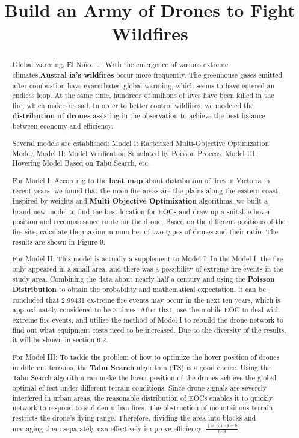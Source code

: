 \documentclass[12pt]{article}  %
\title{Build an Army of Drones to Fight Wildfires}  %
\begin{document}
\begin{abstract}
    
Global warming, El Niño...... With the emergence of various extreme climates,\textbf{Austral-ia's wildfires} occur more frequently. The greenhouse gases emitted after combustion have exacerbated global warming, which seems to have entered an endless loop. At the same time, hundreds of millions of lives have been killed in the fire, which makes us sad. In order to better control wildfires, we modeled the \textbf{distribution of drones} assisting in the observation to achieve the best balance between economy and efficiency.

Several models are established: Model I: Rasterized Multi-Objective Optimization Model; Model II: Model Verification Simulated by Poisson Process; Model III: Hovering Model Based on Tabu Search, etc.

For Model I: According to the \textbf{heat map} about distribution of fires in Victoria in recent years, we found that the main fire areas are the plains along the eastern coast. Inspired by weights and \textbf{Multi-Objective Optimization} algorithms, we built a brand-new model to find the best location for EOCs and draw up a suitable hover position and reconnaissance route for the drone. Based on the different positions of the fire site, calculate the maximum num-ber of two types of drones and their ratio. The results are shown in Figure 9.

For Model II: This model is actually a supplement to Model I. In the Model I, the fire only appeared in a small area, and there was a possibility of extreme fire events in the study area. Combining the data about nearly half a century and using the \textbf{Poisson Distribution }to obtain the probability and mathematical expectation, it can be concluded that 2.99431 ex-treme fire events may occur in the next ten years, which is approximately considered to be 3 times. After that, use the mobile EOC to deal with extreme fire events, and utilize the method of Model I to rebuild the drone network to find out what equipment costs need to be increased. Due to the diversity of the results, it will be shown in section 6.2.

For Model III: To tackle the problem of how to optimize the hover position of drones in different terrains, the \textbf{Tabu Search }algorithm (TS) is a good choice. Using the Tabu Search algorithm can make the hover position of the drones achieve the global optimal ef-fect under different terrain conditions. Since drone signals are severely interfered in urban areas, the reasonable distribution of EOCs enables it to quickly network to respond to sud-den urban fires. The obstruction of mountainous terrain restricts the drone's flying range. Therefore, dividing the area into blocks and managing them separately can effectively im-prove efficiency. $\frac{{(x \cdot \gamma) \cdot \theta + 8}}{{6 \cdot \theta}}$


\end{abstract}
\end{document}
